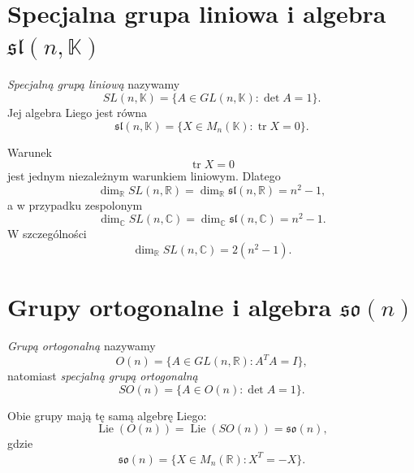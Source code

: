 
\section{Specjalna grupa liniowa i algebra
\texorpdfstring{$\mathfrak{sl}(n,\mathbb K)$}{sl(n,K)}}


\begin{definicja}
\emph{Specjalną grupą liniową} nazywamy
\[
SL(n,\mathbb K)
=
\{A\in GL(n,\mathbb K):\det A=1\}.
\]
Jej algebra Liego jest równa
\[
\mathfrak{sl}(n,\mathbb K)
=
\{X\in M_n(\mathbb K):\operatorname{tr}X=0\}.
\]
\end{definicja}

Warunek
\[
\operatorname{tr}X=0
\]
jest jednym niezależnym warunkiem liniowym. Dlatego
\[
\dim_{\mathbb R}SL(n,\mathbb R)
=
\dim_{\mathbb R}\mathfrak{sl}(n,\mathbb R)
=
n^2-1,
\]
a w przypadku zespolonym
\[
\dim_{\mathbb C}SL(n,\mathbb C)
=
\dim_{\mathbb C}\mathfrak{sl}(n,\mathbb C)
=
n^2-1.
\]
W szczególności
\[
\dim_{\mathbb R}SL(n,\mathbb C)=2(n^2-1).
\]



\section{Grupy ortogonalne i algebra
\texorpdfstring{$\mathfrak{so}(n)$}{so(n)}}
\label{sec:app-grupa-o}


\begin{definicja}
\emph{Grupą ortogonalną} nazywamy
\[
O(n)
=
\{A\in GL(n,\mathbb R):A^TA=I\},
\]
natomiast \emph{specjalną grupą ortogonalną}
\[
SO(n)
=
\{A\in O(n):\det A=1\}.
\]
\end{definicja}

Obie grupy mają tę samą algebrę Liego:
\[
\operatorname{Lie}(O(n))
=
\operatorname{Lie}(SO(n))
=
\mathfrak{so}(n),
\]
gdzie
\[
\mathfrak{so}(n)
=
\{X\in M_n(\mathbb R):X^T=-X\}.
\]

